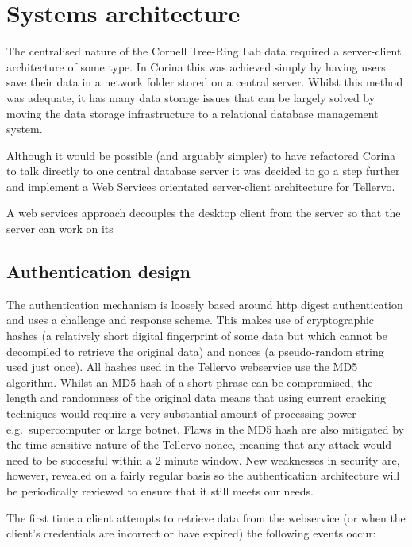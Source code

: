 
\chapter{Systems architecture}
The centralised nature of the Cornell Tree-Ring Lab data required a server-client architecture of some type. In Corina this was achieved simply by having users save their data in a network folder stored on a central server. Whilst this method was adequate, it has many data storage issues that can be largely solved by moving the data storage infrastructure to a relational database management system.  

Although it would be possible (and arguably simpler) to have refactored Corina to talk directly to one central database server it was decided to go a step further and implement a Web Services orientated server-client architecture for Tellervo.  

A web services approach decouples the desktop client from the server so that the server can work on its 

\section{Authentication design}
\label{txt:authentication}
The authentication mechanism is loosely based around http digest authentication and uses a challenge and response scheme. This makes use of cryptographic hashes (a relatively short digital fingerprint of some data but which cannot be decompiled to retrieve the original data) and nonces (a pseudo-random string used just once). All hashes used in the Tellervo webservice use the MD5 algorithm. Whilst an MD5 hash of a short phrase can be compromised, the length and randomness of the original data means that using current cracking techniques would require a very substantial amount of processing power e.g.\ supercomputer or large botnet.  Flaws in the MD5 hash are also mitigated by the time-sensitive nature of the Tellervo nonce, meaning that any attack would need to be successful within a 2 minute window.  New weaknesses in security are, however, revealed on a fairly regular basis so the authentication architecture will be periodically reviewed to ensure that it still meets our needs. 

The first time a client attempts to retrieve data from the webservice (or when the client's credentials are incorrect or have expired) the following events occur:


